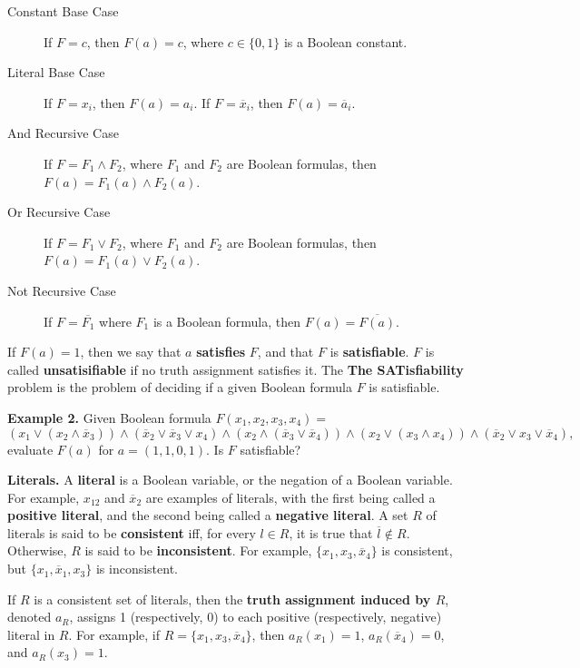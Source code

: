 \documentclass [12pt]{article}
\theoremstyle{definition}
\begin{document}
\begin{description}
\item[Constant Base Case] If $F=c$, then $F(a)=c$, where $c\in\{0,1\}$ is a Boolean constant.
\item[Literal Base Case] If $F=x_{i}$, then $F(a)= a_{i}$. If $F=\overline{x}_{i}$, then 
$F(a)=\overline{a}_{i}$.
\item[And Recursive Case] If $F=F_{1}\wedge F_{2}$, where $F_{1}$ and $F_{2}$ are Boolean formulas, then
$F(a)=F_{1}(a)\wedge F_{2}(a)$.
\item[Or Recursive Case] If $F=F_{1}\vee F_{2}$, where $F_{1}$ and $F_{2}$ are Boolean formulas, then
$F(a)=F_{1}(a)\vee F_{2}(a)$.
\item[Not Recursive Case] If $F=\overline{F_{1}}$ where $F_{1}$ is a Boolean formula, then
$F(a)=\overline{F(a)}$.
\end{description}

If $F(a)=1$, then we say that $a$ {\bf satisfies} $F$, and that $F$ is {\bf satisfiable}.
$F$ is called {\bf unsatisifiable} if no truth assignment satisfies it.
The 
{\bf The SATisfiability} problem is the problem of deciding if a given Boolean formula $F$ is satisfiable.

{\bf Example 2.} Given Boolean formula $F(x_{1},x_{2},x_{3},x_{4})=$
\[(x_{1}\vee(x_{2}\wedge\overline{x}_{3}))\wedge
(\overline{x}_{2}\vee \overline{x}_{3}\vee x_{4})\wedge
(x_{2}\wedge(\overline{x}_{3}\vee\overline{x}_{4}))\wedge
(x_{2}\vee(x_{3}\wedge x_{4}))\wedge
(\overline{x}_{2}\vee x_{3}\vee \overline{x}_{4}),\]
evaluate $F(a)$ for $a=(1,1,0,1)$. Is $F$ satisfiable?




\newpage
\noindent
{\bf Literals.} A {\bf literal} is 
a Boolean variable, or the negation of a Boolean variable. For example, 
$x_{12}$ and $\overline{x}_{2}$ are examples of literals, with the first being
called a {\bf positive literal}, and the second being called a {\bf negative literal}. A set $R$ of literals is said to be \textbf{consistent} iff, for every $l\in R$, it is true that $\overline{l}\not\in R$.
Otherwise, $R$ is said to be \textbf{inconsistent}.
For example, $\{x_{1},x_{3},\overline{x}_{4}\}$ is consistent, but $\{x_{1},\overline{x}_{1},x_{3}\}$ is inconsistent. 

If $R$ is a consistent set of literals, then the \textbf{truth assignment induced by $R$}, denoted $a_{R}$, assigns 1 (respectively, 0) to each positive (respectively, negative) literal in $R$.
For example, if $R=\{x_{1},x_{3},\overline{x}_{4}\}$, then $a_{R}(x_{1})=1$, $a_{R}(\overline{x}_{4})=0$, and $a_{R}(x_{3})=1$.
\end{document}
